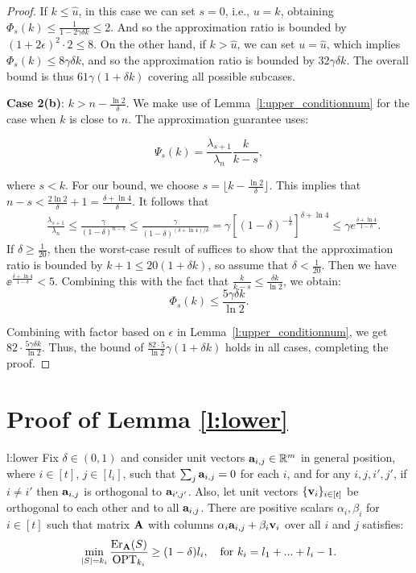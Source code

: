 \documentclass{article}
\begin{document}
\begin{proof}
If  $k  \leq \hat{u}$, in this case we can set $s=0$, i.e., $u = k$, obtaining $\Phi_s(k) \leq \frac{1}{1- 2\gamma\delta k}\leq 2$. And so the
approximation ratio is bounded by $(1+2\epsilon)^2 \cdot 2 \leq 8$. On the other
hand, if $k > \hat{u}$, we can set $u=\hat{u}$, which implies
$\Phi_s(k) \leq 8\gamma\delta k$, and so the approximation ratio is
bounded by $ 32
\gamma\delta k$. The overall bound is thus $61\gamma(1+\delta k)$
covering all possible subcases. 
  
  \bigskip
  \textbf{Case 2(b)}: $k > n - \frac{\ln 2}{\delta}$. We make use of
  Lemma~\ref{l:upper_conditionnum} for the case when $k$ is close to
  $n$. The approximation guarantee uses:  
   
  \[\Psi_s(k) = \frac{\lambda_{s+1}}{\lambda_n} \frac{k}{k-s},\]
  
where $s <k$. For our bound, we choose $s = \lfloor k- \frac{\ln
  2}{\delta}\rfloor$. This implies that $n-s < \frac{2\ln
  2}{\delta}+1=\frac{\delta+\ln4}{\delta}$. It
follows that
  \begin{align*}
    & \frac{\lambda_{s+1}}{\lambda_n}  \leq
     \frac{ \gamma}{(1-\delta)^{n-s}} \leq
      \frac{\gamma}{(1-\delta)^{(\delta+\ln 4)/\delta}} =
      \gamma\left[(1-\delta)^{-\frac{1}{\delta}}\right] ^ {\delta+\ln 4} \leq
      \gamma e^{\frac{\delta+\ln 4}{1-\delta}}. 
  \end{align*}
  If $\delta\geq \frac1{20}$, then the worst-case result of
  \citet{pca-volume-sampling} suffices to show that the approximation ratio is
  bounded by $k+1\leq 20(1+\delta k)$, so assume that
  $\delta<\frac1{20}$. Then we have $\ee^{\frac{\delta+\ln 4}{1-\delta}}<5.$
  Combining this with the fact that $\frac{k}{k-s} \leq \frac{\delta k}{\ln 2}$,
we obtain:
  \[\Phi_s(k) \leq \frac{5\gamma\delta k}{\ln 2}. \]
  
  Combining with factor based on $\epsilon$ in
  Lemma~\ref{l:upper_conditionnum}, we get $82\cdot
  \frac{5\gamma\delta k}{\ln 2}$. Thus, the bound of $\frac{82\cdot
    5}{\ln 2}\gamma(1+\delta k)$ holds in all cases, completing the proof.
\end{proof}

\section{Proof of Lemma \ref{l:lower}}
\begin{replemma}{l:lower}
Fix $\delta\in(0,1)$ and consider unit vectors
$\mathbf a_{i,j}\in\mathbb R^m$ in general position, where $i\in[t]$, $j\in[l_i]$, such that
$\sum_j\mathbf a_{i,j}=0$ for each $i$, and for any $i,j,i',j'$, if $i\ne i'$
then $\mathbf a_{i,j}$ is orthogonal to $\mathbf a_{i'\!,j'}$. Also, let unit vectors
$\{\mathbf v_i\}_{i\in[t]}$ be orthogonal to  each other and to all
$\mathbf a_{i,j}$. There are positive scalars $\alpha_{i},\beta_i$ for $ i \in [t]$
such that matrix $\mathbf A$ with columns 
$\alpha_{i}\mathbf a_{i,j}+\beta_i\mathbf v_i$ over all $i$ and $j$ satisfies: 
\begin{align*}
  \min_{|S|=k_i}\frac{\mathrm{Er}_\mathbf A(S)}{\mathrm{OPT}_{k_i}}\geq
  (1-\delta)l_i,\quad\text{for }k_i=l_1+...+l_i-1.
\end{align*}
 \end{replemma}
\end{document}
